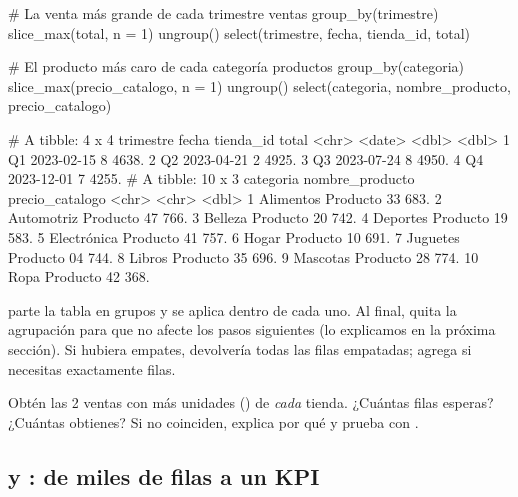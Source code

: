 \begin{rcode}
# La venta más grande de cada trimestre
ventas %
  group_by(trimestre) %
  slice_max(total, n = 1) %
  ungroup() %
  select(trimestre, fecha, tienda_id, total)

# El producto más caro de cada categoría
productos %
  group_by(categoria) %
  slice_max(precio_catalogo, n = 1) %
  ungroup() %
  select(categoria, nombre_producto, precio_catalogo)
\end{rcode}
\begin{rsalida}
# A tibble: 4 x 4
  trimestre fecha      tienda_id total
  <chr>     <date>         <dbl> <dbl>
1 Q1        2023-02-15         8 4638.
2 Q2        2023-04-21         2 4925.
3 Q3        2023-07-24         8 4950.
4 Q4        2023-12-01         7 4255.
# A tibble: 10 x 3
   categoria   nombre_producto precio_catalogo
   <chr>       <chr>                     <dbl>
 1 Alimentos   Producto 33                683.
 2 Automotriz  Producto 47                766.
 3 Belleza     Producto 20                742.
 4 Deportes    Producto 19                583.
 5 Electrónica Producto 41                757.
 6 Hogar       Producto 10                691.
 7 Juguetes    Producto 04                744.
 8 Libros      Producto 35                696.
 9 Mascotas    Producto 28                774.
10 Ropa        Producto 42                368.
\end{rsalida}

 parte la tabla en grupos y  se
aplica dentro de cada uno. Al final,  quita la agrupación
para que no afecte los pasos siguientes (lo explicamos en la próxima
sección). Si hubiera empates,  devolvería todas las
filas empatadas; agrega  si necesitas exactamente
 filas.

\begin{hazlotu}
Obtén las 2 ventas con más unidades () de \emph{cada}
tienda. ¿Cuántas filas esperas? ¿Cuántas obtienes? Si no coinciden,
explica por qué y prueba con .
\end{hazlotu}

\subsection{\texorpdfstring{}{summarise()} y \texorpdfstring{}{group\_by()}: de miles de filas a un KPI}
\label{sec:m2-summarise}


